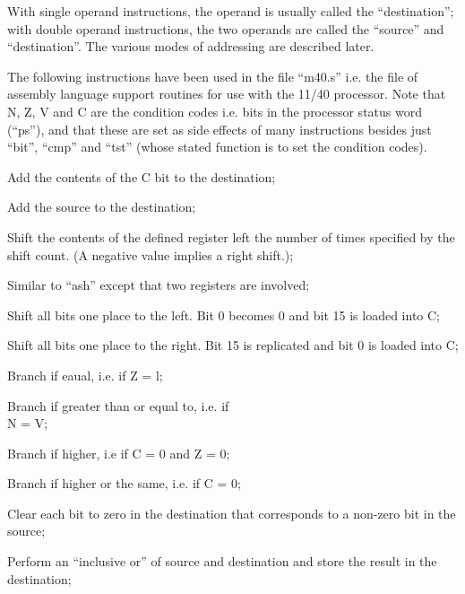 With single operand instructions, the
operand is usually called the ``destination'';
with double operand instructions, the two operands are called the
``source'' and ``destination''. The various
modes of addressing are described later.

The following instructions have been
used in the file ``m40.s'' i.e. the file
of assembly language support routines
for use with the 11/40 processor. Note
that N, Z, V and C are the condition
codes i.e. bits in the processor status
word (``ps''), and that these are set as
side effects of many instructions
besides just ``bit'', ``cmp'' and ``tst''
(whose stated function is to set the
condition codes).

\bd
\item[adc] Add the contents of the C bit to
the destination;

\item[add] Add the source to the destination;

\item[ash] Shift the contents of the defined
register left the number of times
specified by the shift count. (A
negative value implies a right
shift.);

\item[ashc] Similar to ``ash'' except that two
registers are involved;


\item[asl] Shift all bits one place to the
left. Bit 0 becomes 0 and bit 15
is loaded into C;


\item[asr] Shift all bits one place to the
right. Bit 15 is replicated and
bit 0 is loaded into C;

\item[beq] Branch if eaual, i.e. if Z = l;


\item[bge] Branch if greater than or equal
to, i.e. if\\
N = V;

\item[bhi] Branch if higher, i.e if C = 0 and
Z = 0;

\item[bhis] Branch if higher or the same, i.e.
if C = 0;


\item[bic] Clear each bit to zero in the
destination that corresponds to a
non-zero bit in the source;


\item[bis] Perform an ``inclusive or'' of
source and destination and store
the result in the destination;


